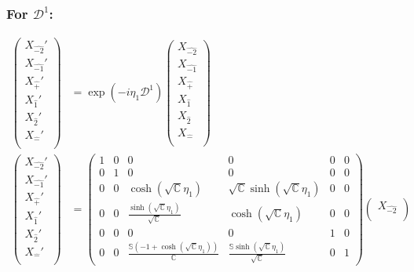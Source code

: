 \documentclass[]{article}
\numberwithin{equation}{section}
\begin{document}
{{\subsubsection{For $\mathcal{D}^{1}$:}
\begin{align}
\begin{pmatrix}
    {X}_{\hat{-2}}'\\
    {X}_{\hat{-1}}'\\
    {X}_{\hat{+}}'\\
    {X}_{\hat{1}}'\\
    {X}_{\hat{2}}'\\
    {X}_{\hat{-}}'\\
    \end{pmatrix}&= \exp{(-i\eta_{1} \mathcal{D}^{1})}\begin{pmatrix}
    {X}_{\hat{-2}}\\
    {X}_{\hat{-1}}\\
    {X}_{\hat{+}}\\
    {X}_{\hat{1}}\\
    {X}_{\hat{2}}\\
    {X}_{\hat{-}}\\
    \end{pmatrix}\\
    \begin{pmatrix}
    {X}_{\hat{-2}}'\\
    {X}_{\hat{-1}}'\\
    {X}_{\hat{+}}'\\
    {X}_{\hat{1}}'\\
    {X}_{\hat{2}}'\\
    {X}_{\hat{-}}'\\
    \end{pmatrix}&= \begin{pmatrix}
        1&0&0&0&0&0\\
        0&1&0&0&0&0\\
        0&0&\cosh{(\sqrt{\mathbb{C}}\eta_{1})}&\sqrt{\mathbb{C}}\sinh{(\sqrt{\mathbb{C}}\eta_{1})}&0&0\\
        0&0&\frac{\sinh{(\sqrt{\mathbb{C}}\eta_{1})}}{\sqrt{\mathbb{C}}}&\cosh{(\sqrt{\mathbb{C}}\eta_{1})}&0&0\\
        0&0&0&0&1&0\\
        0&0&\frac{\mathbb{S}(-1+\cosh{(\sqrt{\mathbb{C}}\eta_{1})})}{\mathbb{C}}&\frac{\mathbb{S}\sinh{(\sqrt{\mathbb{C}}\eta_{1})}}{\sqrt{\mathbb{C}}}&0&1
    \end{pmatrix}\begin{pmatrix}
    {X}_{\hat{-2}}\\

\end{pmatrix}
\end{align}}}
\end{document}
